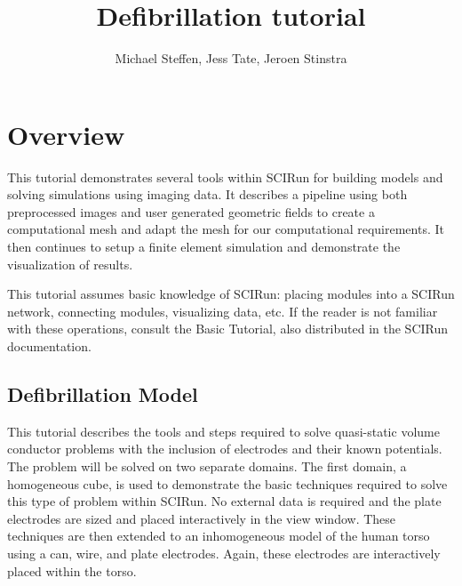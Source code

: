 \documentclass[fleqn,11pt,openany]{book}
\title{Defibrillation tutorial}
\author{Michael Steffen, Jess Tate, Jeroen Stinstra}
\begin{document}


\maketitle


\chapter{Overview}

\begin{introduction}

This tutorial demonstrates several tools within SCIRun for building
models and solving simulations using imaging data. It describes a
pipeline using both preprocessed images and user generated geometric
fields to create a computational mesh and adapt the mesh for our
computational requirements. It then continues to setup a finite
element simulation and demonstrate the visualization of results.

This tutorial assumes basic knowledge of SCIRun: placing modules into
a SCIRun network, connecting modules, visualizing data, etc. If the
reader is not familiar with these operations, consult the Basic
Tutorial, also distributed in the SCIRun documentation.

\end{introduction}

\section{Defibrillation Model}

This tutorial describes the tools and steps required to solve
quasi-static volume conductor problems with the inclusion of
electrodes and their known potentials. The problem will be solved on
two separate domains. The first domain, a homogeneous cube, is used to
demonstrate the basic techniques required to solve this type of
problem within SCIRun. No external data is required and the plate
electrodes are sized and placed interactively in the view
window. These techniques are then extended to an inhomogeneous model
of the human torso using a can, wire, and plate electrodes. Again,
these electrodes are interactively placed within the torso.
\end{document}
